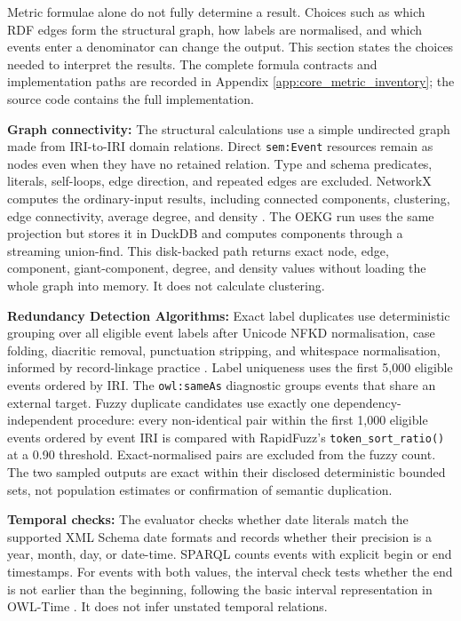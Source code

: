 Metric formulae alone do not fully determine a result. Choices such as which RDF edges form the structural graph, how labels are normalised, and which events enter a denominator can change the output. This section states the choices needed to interpret the results. The complete formula contracts and implementation paths are recorded in Appendix \ref{app:core_metric_inventory}; the source code contains the full implementation.

\textbf{Graph connectivity:} The structural calculations use a simple undirected graph made from IRI-to-IRI domain relations. Direct \texttt{sem:Event} resources remain as nodes even when they have no retained relation. Type and schema predicates, literals, self-loops, edge direction, and repeated edges are excluded. NetworkX computes the ordinary-input results, including connected components, clustering, edge connectivity, average degree, and density \citep{newman2018,watts1998}. The OEKG run uses the same projection but stores it in DuckDB and computes components through a streaming union-find. This disk-backed path returns exact node, edge, component, giant-component, degree, and density values without loading the whole graph into memory. It does not calculate clustering.

\textbf{Redundancy Detection Algorithms:} Exact label duplicates use deterministic grouping over all eligible event labels after Unicode NFKD normalisation, case folding, diacritic removal, punctuation stripping, and whitespace normalisation, informed by record-linkage practice \citep{fellegi1969,christen2012}. Label uniqueness uses the first 5,000 eligible events ordered by IRI. The \texttt{owl:sameAs} diagnostic groups events that share an external target. Fuzzy duplicate candidates use exactly one dependency-independent procedure: every non-identical pair within the first 1,000 eligible events ordered by event IRI is compared with RapidFuzz's \texttt{token\_sort\_ratio()} at a 0.90 threshold. Exact-normalised pairs are excluded from the fuzzy count. The two sampled outputs are exact within their disclosed deterministic bounded sets, not population estimates or confirmation of semantic duplication.

\textbf{Temporal checks:} The evaluator checks whether date literals match the supported XML Schema date formats and records whether their precision is a year, month, day, or date-time. SPARQL counts events with explicit begin or end timestamps. For events with both values, the interval check tests whether the end is not earlier than the beginning, following the basic interval representation in OWL-Time \citep{owltime2017}. It does not infer unstated temporal relations.

